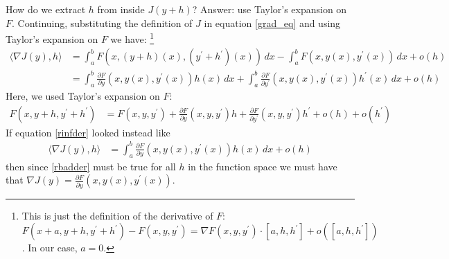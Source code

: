 \documentclass{article}
\begin{document}
How do we extract $h$ from inside $J(y+h)$? Answer: use
Taylor's expansion on $F$. Continuing, substituting the definition of $J$ in equation
\eqref{grad_eq} and using Taylor's expansion on $F$ we have:%
\footnote{This is just the definition of the derivative of $F$:
$F(x + a, y+h, y^\prime + h^\prime) - F(x,y,y^\prime) = \nabla F(x,y,y^\prime) \cdot [a,h,h^\prime] + o([a,h,h^\prime])$. In our case, $a = 0$.
}
\begin{align}
  \langle \nabla J(y), h \rangle  &= \int_a^b F(x, (y+h)(x), (y^\prime + h^\prime)(x)) \, dx
  - \int_a^b F(x, y(x), y^\prime(x)) \, dx  + o(h) \nonumber \\
&= \int_a^b \frac{\partial F}{\partial y}(x, y(x), y^\prime(x))h(x)\, dx
+ \int_a^b \frac{\partial F}{\partial y^\prime}(x, y(x), y^\prime(x))h^\prime(x) \, dx
+ o(h) \label{rinfder}
\end{align}
Here, we used Taylor's expansion on $F$:
\begin{align}
  F(x, y+h, y^\prime + h^\prime) &= F(x,y,y^\prime) + \frac{\partial F}{\partial y}(x,y,y^\prime) h + \frac{\partial F}{\partial
    y^\prime}(x,y,y^\prime) h^\prime + o(h) + o(h^\prime)
\end{align}
If equation \eqref{rinfder} looked instead like
\begin{align}
  \langle \nabla J(y), h \rangle  &=
 \int_a^b \frac{\partial F}{\partial y}(x, y(x), y^\prime(x))h(x)\, dx
+ o(h) \label{rbadder}
\end{align}
then since \eqref{rbadder} must be true for all $h$ in the function space we must
have that $\nabla J(y) = \frac{\partial F}{\partial y}(x, y(x), y^\prime(x))$.
\end{document}

